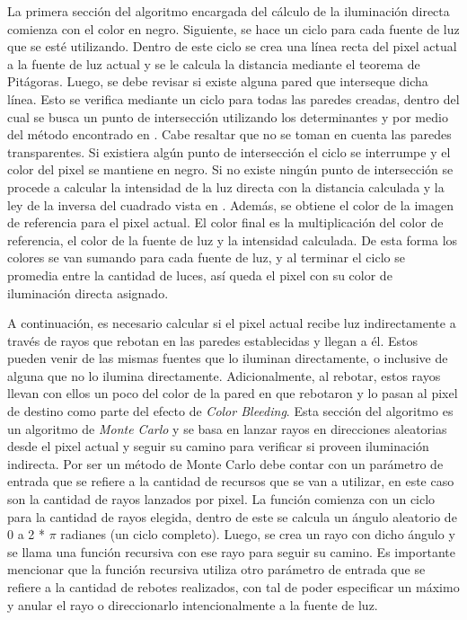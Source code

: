 \documentclass[conference]{IEEEtran}
\begin{document}
La primera sección del algoritmo encargada del cálculo de la iluminación directa comienza con el color en negro. Siguiente, se hace un ciclo para cada fuente de luz que se esté utilizando. Dentro de este ciclo se crea una línea recta del pixel actual a la fuente de luz actual y se le calcula la distancia mediante el teorema de Pitágoras. Luego, se debe revisar si existe alguna pared que interseque dicha línea. Esto se verifica mediante un ciclo para todas las paredes creadas, dentro del cual se busca un punto de intersección utilizando los determinantes y por medio del método encontrado en \cite{b6}. Cabe resaltar que no se toman en cuenta las paredes transparentes. Si existiera algún punto de intersección el ciclo se interrumpe y el color del pixel se mantiene en negro. Si no existe ningún punto de intersección se procede a calcular la intensidad de la luz directa con la distancia calculada y la ley de la inversa del cuadrado vista en \cite{b7}. Además, se obtiene el color de la imagen de referencia para el pixel actual. El color final es la multiplicación del color de referencia, el color de la fuente de luz y la intensidad calculada. De esta forma los colores se van sumando para cada fuente de luz, y al terminar el ciclo se promedia entre la cantidad de luces, así queda el pixel con su color de iluminación directa asignado. 

A continuación, es necesario calcular si el pixel actual recibe luz indirectamente a través de rayos que rebotan en las paredes establecidas y llegan a él. Estos pueden venir de las mismas fuentes que lo iluminan directamente, o inclusive de alguna que no lo ilumina directamente. Adicionalmente, al rebotar, estos rayos llevan con ellos un poco del color de la pared en que rebotaron y lo pasan al pixel de destino como parte del efecto de \textit{Color Bleeding}. Esta sección del algoritmo es un algoritmo de \textit{Monte Carlo} y se basa en lanzar rayos en direcciones aleatorias desde el pixel actual y seguir su camino para verificar si proveen iluminación indirecta. Por ser un método de Monte Carlo debe contar con un parámetro de entrada que se refiere a la cantidad de recursos que se van a utilizar, en este caso son la cantidad de rayos lanzados por pixel. La función comienza con un ciclo para la cantidad de rayos elegida, dentro de este se calcula un ángulo aleatorio de 0 a 2 * $\pi$ radianes (un ciclo completo). Luego, se crea un rayo con dicho ángulo y se llama una función recursiva con ese rayo para seguir su camino. Es importante mencionar que la función recursiva utiliza otro parámetro de entrada que se refiere a la cantidad de rebotes realizados, con tal de poder especificar un máximo y anular el rayo o direccionarlo intencionalmente a la fuente de luz.
\end{document}
